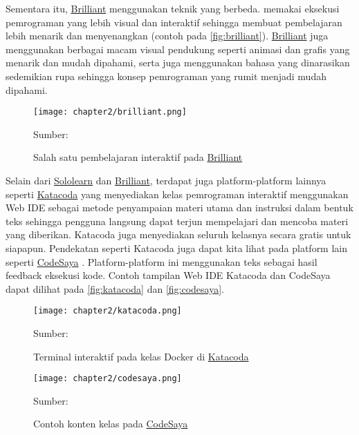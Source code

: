 Sementara itu, \href{https://brilliant.org}{Brilliant} menggunakan teknik yang berbeda. \textcite{brilliant2021media} memakai eksekusi pemrograman yang lebih visual dan interaktif sehingga membuat pembelajaran lebih menarik dan menyenangkan (contoh pada \autoref{fig:brilliant}). \href{https://brilliant.org}{Brilliant} juga menggunakan berbagai macam visual pendukung seperti animasi dan grafis yang menarik dan mudah dipahami, serta juga menggunakan bahasa yang dinarasikan sedemikian rupa sehingga konsep pemrograman yang rumit menjadi mudah dipahami.

\begin{figure}[H]
  \centering
  \texttt{[image: chapter2/brilliant.png]}
  \caption{\label{fig:brilliant}Salah satu pembelajaran interaktif pada \href{https://brilliant.org}{Brilliant}}
  Sumber: \textcite{brilliant2021media}
\end{figure}

Selain dari \href{https://www.sololearn.com}{Sololearn} dan \href{https://brilliant.org}{Brilliant}, terdapat juga platform-platform lainnya seperti \href{https://www.katacoda.com/}{Katacoda} \parencite{katacoda2021media} yang menyediakan kelas pemrograman interaktif menggunakan Web IDE sebagai metode penyampaian materi utama dan instruksi dalam bentuk teks sehingga pengguna langsung dapat terjun mempelajari dan mencoba materi yang diberikan. Katacoda juga menyediakan seluruh kelasnya secara gratis untuk siapapun. Pendekatan seperti Katacoda juga dapat kita lihat pada platform lain seperti \href{https://www.codesaya.com/}{CodeSaya} \parencite{codesaya2021media}. Platform-platform ini menggunakan teks sebagai hasil feedback eksekusi kode. Contoh tampilan Web IDE Katacoda dan CodeSaya dapat dilihat pada \autoref{fig:katacoda} dan \autoref{fig:codesaya}.

\begin{figure}[H]
  \centering
  \texttt{[image: chapter2/katacoda.png]}
  \caption{\label{fig:katacoda}Terminal interaktif pada kelas Docker di \href{https://www.katacoda.com/}{Katacoda}}
  Sumber: \textcite{katacoda2021media}
\end{figure}

\begin{figure}[H]
  \centering
  \texttt{[image: chapter2/codesaya.png]}
  \caption{\label{fig:codesaya}Contoh konten kelas pada \href{https://www.codesaya.com/}{CodeSaya}}
  Sumber: \textcite{codesaya2021media}
\end{figure}

